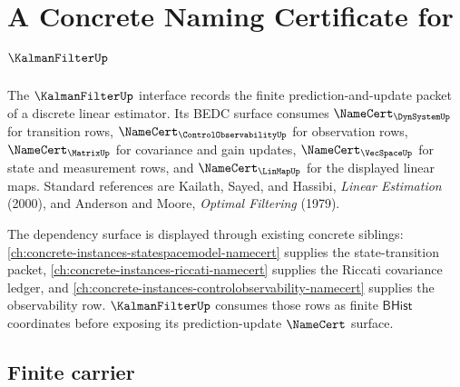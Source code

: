 \chapter{A Concrete Naming Certificate for $\KalmanFilterUp$}
\label{ch:concrete-instances-kalmanfilter-namecert}

The $\KalmanFilterUp$ interface records the finite prediction-and-update packet of a discrete linear estimator. Its BEDC surface consumes $\NameCert_{\DynSystemUp}$ for transition rows, $\NameCert_{\ControlObservabilityUp}$ for observation rows, $\NameCert_{\MatrixUp}$ for covariance and gain updates, $\NameCert_{\VecSpaceUp}$ for state and measurement rows, and $\NameCert_{\LinMapUp}$ for the displayed linear maps. Standard references are Kailath, Sayed, and Hassibi, \emph{Linear Estimation} (2000), and Anderson and Moore, \emph{Optimal Filtering} (1979).

The dependency surface is displayed through existing concrete siblings: \autoref{ch:concrete-instances-statespacemodel-namecert} supplies the state-transition packet, \autoref{ch:concrete-instances-riccati-namecert} supplies the Riccati covariance ledger, and \autoref{ch:concrete-instances-controlobservability-namecert} supplies the observability row. $\KalmanFilterUp$ consumes those rows as finite $\mathsf{BHist}$ coordinates before exposing its prediction-update $\NameCert$ surface.

\section{Finite carrier}
\label{sec:kalmanfilter-carrier}

